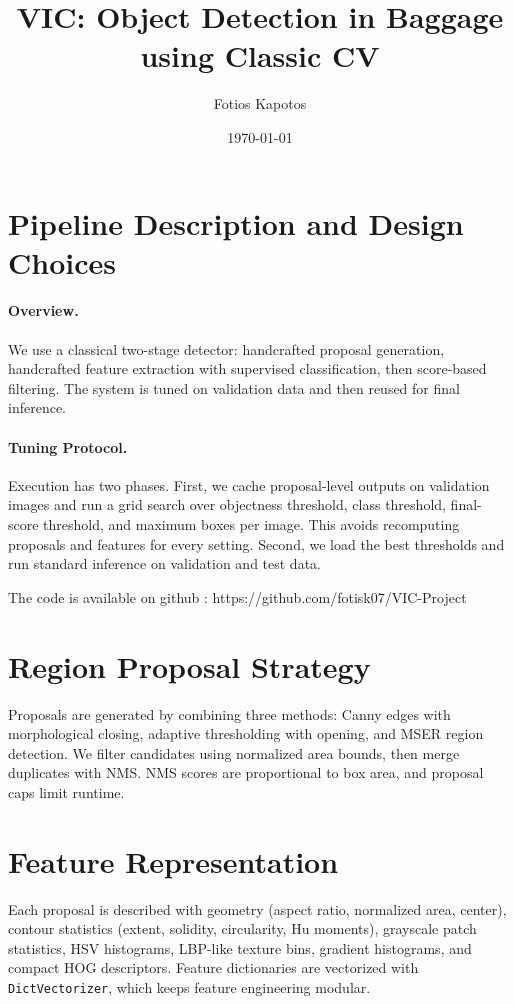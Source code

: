 \documentclass[11pt]{article}
\title{VIC: Object Detection in Baggage using Classic CV}
\author{Fotios Kapotos}
\date{\today}
\begin{document}
\maketitle


\section*{Pipeline Description and Design Choices}

\paragraph{Overview.}
We use a classical two-stage detector: handcrafted proposal generation, handcrafted feature extraction with supervised classification, then score-based filtering. The system is tuned on validation data and then reused for final inference.

\paragraph{Tuning Protocol.}
Execution has two phases. First, we cache proposal-level outputs on validation images and run a grid search over objectness threshold, class threshold, final-score threshold, and maximum boxes per image. This avoids recomputing proposals and features for every setting. Second, we load the best thresholds and run standard inference on validation and test data.

The code is available on github : https://github.com/fotisk07/VIC-Project

\section{Region Proposal Strategy}

Proposals are generated by combining three methods: Canny edges with morphological closing, adaptive thresholding with opening, and MSER region detection. We filter candidates using normalized area bounds, then merge duplicates with NMS. NMS scores are proportional to box area, and proposal caps limit runtime.

\section{Feature Representation}

Each proposal is described with geometry (aspect ratio, normalized area, center), contour statistics (extent, solidity, circularity, Hu moments), grayscale patch statistics, HSV histograms, LBP-like texture bins, gradient histograms, and compact HOG descriptors. Feature dictionaries are vectorized with \texttt{DictVectorizer}, which keeps feature engineering modular.
\end{document}
